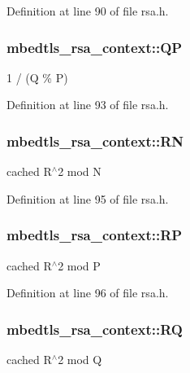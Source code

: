 Definition at line 90 of file rsa.\-h.

\hypertarget{structmbedtls__rsa__context_a76dad2612cdce4bc90933d317d3adc92}{
\subsubsection[{Q\-P}]{ mbedtls\-\_\-rsa\-\_\-context\-::\-Q\-P}}\label{structmbedtls__rsa__context_a76dad2612cdce4bc90933d317d3adc92}
1 / (Q \% P) 

Definition at line 93 of file rsa.\-h.

\hypertarget{structmbedtls__rsa__context_a6e8530ea71b28336cbebd77219757271}{
\subsubsection[{R\-N}]{ mbedtls\-\_\-rsa\-\_\-context\-::\-R\-N}}\label{structmbedtls__rsa__context_a6e8530ea71b28336cbebd77219757271}
cached R$^\wedge$2 mod N 

Definition at line 95 of file rsa.\-h.

\hypertarget{structmbedtls__rsa__context_a97215f3f5482cfb4887d00d47f030610}{
\subsubsection[{R\-P}]{ mbedtls\-\_\-rsa\-\_\-context\-::\-R\-P}}\label{structmbedtls__rsa__context_a97215f3f5482cfb4887d00d47f030610}
cached R$^\wedge$2 mod P 

Definition at line 96 of file rsa.\-h.

\hypertarget{structmbedtls__rsa__context_a495e2de1f324a00ba83fe1aa72652a06}{
\subsubsection[{R\-Q}]{ mbedtls\-\_\-rsa\-\_\-context\-::\-R\-Q}}\label{structmbedtls__rsa__context_a495e2de1f324a00ba83fe1aa72652a06}
cached R$^\wedge$2 mod Q 


